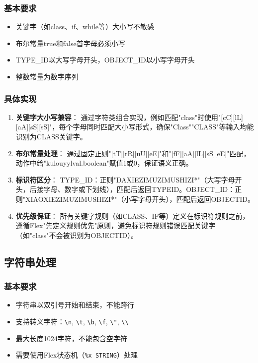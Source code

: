 \documentclass[twocolumn]{article}
\begin{document}
\subsubsection{基本要求}
\begin{itemize}
    \item 关键字（如class、if、while等）大小写不敏感
    \item 布尔常量true和false首字母必须小写
    \item TYPE\_ID以大写字母开头，OBJECT\_ID以小写字母开头
    \item 整数常量为数字序列
\end{itemize}

\subsubsection{具体实现}
\begin{enumerate}
    \item \textbf{关键字大小写兼容}：
      通过字符类组合实现，例如匹配"class"时使用"[cC][lL][aA][sS][sS]"，每个字母同时匹配大小写形式，确保"Class""CLASS"等输入均能识别为CLASS关键字。

    \item \textbf{布尔常量处理}：
      通过固定正则"[tT][rR][uU][eE]"和"[fF][aA][lL][sS][eE]"匹配，动作中给"kulouyylval.boolean"赋值1或0，保证语义正确。

    \item \textbf{标识符区分}：
      TYPE\_ID：正则"{DAXIEZIMU}{ZIMUSHIZI}*"（大写字母开头，后接字母、数字或下划线），匹配后返回TYPEID。OBJECT\_ID：正则"{XIAOXIEZIMU}{ZIMUSHIZI}*"（小写字母开头），匹配后返回OBJECTID。

    \item \textbf{优先级保证}：
      所有关键字规则（如CLASS、IF等）定义在标识符规则之前，遵循Flex"先定义规则优先"原则，避免标识符规则错误匹配关键字（如"class"不会被识别为OBJECTID）。
\end{enumerate}

\subsection{字符串处理}

\subsubsection{基本要求}
\begin{itemize}
    \item 字符串以双引号开始和结束，不能跨行
    \item 支持转义字符：\texttt{\textbackslash n}, \texttt{\textbackslash t}, \texttt{\textbackslash b}, \texttt{\textbackslash f}, \texttt{\textbackslash "}, \texttt{\textbackslash\textbackslash}
    \item 最大长度1024字符，不能包含空字符
    \item 需要使用Flex状态机（\texttt{\%x STRING}）处理
\end{itemize}
\end{document}
